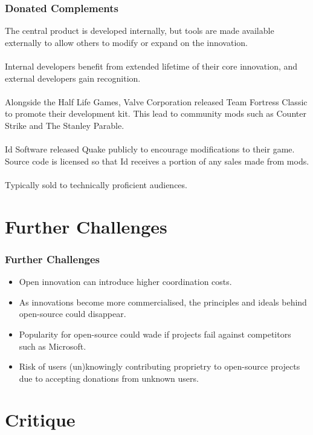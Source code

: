 \documentclass{beamer}
\begin{document}
\begin{frame}
\frametitle{Donated Complements}
The central product is developed internally, but tools are made available externally to allow others to modify or expand on the innovation.\\~\\

Internal developers benefit from extended lifetime of their core innovation, and external developers gain recognition.\\~\\

Alongside the Half Life Games, Valve Corporation released Team Fortress Classic to promote their development kit. This lead to community mods such as Counter Strike and The Stanley Parable.\\~\\

Id Software released Quake publicly to encourage modifications to their game. Source code is licensed so that Id receives a portion of any sales made from mods.\\~\\

Typically sold to technically proficient audiences.
\end{frame}

\section{Further Challenges}

\begin{frame}
\frametitle{Further Challenges}
\begin{itemize}[<+->]
\item Open innovation can introduce higher coordination costs.
\item As innovations become more commercialised, the principles and ideals behind open-source could disappear.
\item Popularity for open-source could wade if projects fail against competitors such as Microsoft.
\item Risk of users (un)knowingly contributing proprietry to open-source projects due to accepting donations from unknown users.
\end{itemize}
\end{frame}

\section{Critique}
\end{document}

